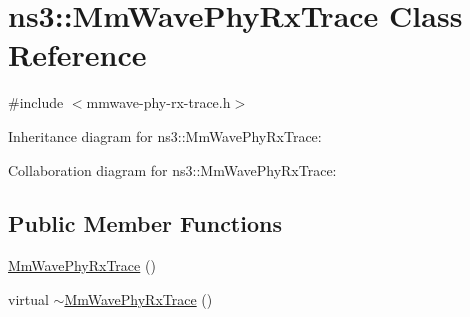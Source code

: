 \hypertarget{classns3_1_1MmWavePhyRxTrace}{}\section{ns3\+:\+:Mm\+Wave\+Phy\+Rx\+Trace Class Reference}
\label{classns3_1_1MmWavePhyRxTrace}


{\ttfamily \#include $<$mmwave-\/phy-\/rx-\/trace.\+h$>$}



Inheritance diagram for ns3\+:\+:Mm\+Wave\+Phy\+Rx\+Trace\+:


Collaboration diagram for ns3\+:\+:Mm\+Wave\+Phy\+Rx\+Trace\+:
\subsection*{Public Member Functions}
\begin{DoxyCompactItemize}
\item 
\hyperlink{classns3_1_1MmWavePhyRxTrace_aab8f23d43a4e882d9647e7acb53bb468}{Mm\+Wave\+Phy\+Rx\+Trace} ()
\item 
virtual \hyperlink{classns3_1_1MmWavePhyRxTrace_a64cfcf8def02da51ac8da7175bf18637}{$\sim$\+Mm\+Wave\+Phy\+Rx\+Trace} ()
\end{DoxyCompactItemize}
